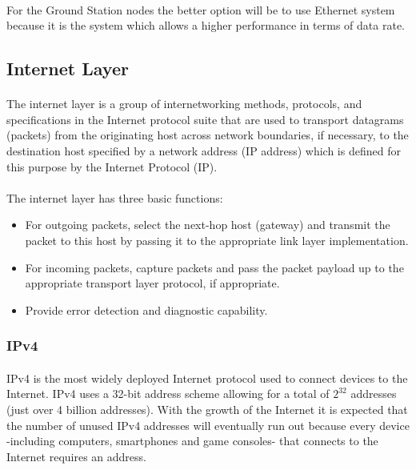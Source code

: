 \paragraph{}
For the Ground Station nodes the better option will be to use Ethernet system because it is the system which allows a higher performance in terms of data rate.


\subsection{Internet Layer}
\paragraph{}
The internet layer is a group of internetworking methods, protocols, and specifications in the Internet protocol suite that are used to transport datagrams (packets) from the originating host across network boundaries, if necessary, to the destination host specified by a network address (IP address) which is defined for this purpose by the Internet Protocol (IP). 
\paragraph{}
The internet layer has three basic functions:
\begin{itemize}
\item For outgoing packets, select the next-hop host (gateway) and transmit the packet to this host by passing it to the appropriate link layer implementation.
\item For incoming packets, capture packets and pass the packet payload up to the appropriate transport layer protocol, if appropriate.
\item Provide error detection and diagnostic capability.
\end{itemize}

\subsubsection{IPv4}
\paragraph{}
IPv4 is the most widely deployed Internet protocol used to connect devices to the Internet. IPv4 uses a 32-bit address scheme allowing for a total of $ 2^{32} $ addresses (just over 4 billion addresses).  With the growth of the Internet it is expected that the number of unused IPv4 addresses will eventually run out because every device -including computers, smartphones and game consoles- that connects to the Internet requires an address.

